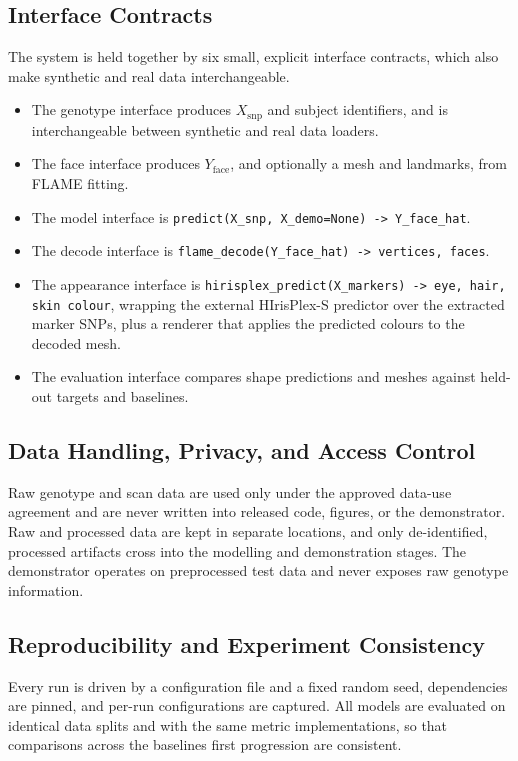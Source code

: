 \subsection{Interface Contracts}
\label{sec:interfaces}
The system is held together by six small, explicit interface contracts, which also make synthetic and real data interchangeable.
\begin{itemize}
\item The genotype interface produces $X_{\mathrm{snp}}$ and subject identifiers, and is interchangeable between synthetic and real data loaders.
\item The face interface produces $Y_{\mathrm{face}}$, and optionally a mesh and landmarks, from FLAME fitting.
\item The model interface is \texttt{predict(X\_snp, X\_demo=None) -> Y\_face\_hat}.
\item The decode interface is \texttt{flame\_decode(Y\_face\_hat) -> vertices, faces}.
\item The appearance interface is \texttt{hirisplex\_predict(X\_markers) -> eye, hair, skin colour}, wrapping the external HIrisPlex-S predictor over the extracted marker SNPs, plus a renderer that applies the predicted colours to the decoded mesh.
\item The evaluation interface compares shape predictions and meshes against held-out targets and baselines.
\end{itemize}

\subsection{Data Handling, Privacy, and Access Control}
Raw genotype and scan data are used only under the approved data-use agreement and are never written into released code, figures, or the demonstrator. Raw and processed data are kept in separate locations, and only de-identified, processed artifacts cross into the modelling and demonstration stages. The demonstrator operates on preprocessed test data and never exposes raw genotype information.

\subsection{Reproducibility and Experiment Consistency}
Every run is driven by a configuration file and a fixed random seed, dependencies are pinned, and per-run configurations are captured. All models are evaluated on identical data splits and with the same metric implementations, so that comparisons across the baselines first progression are consistent.

